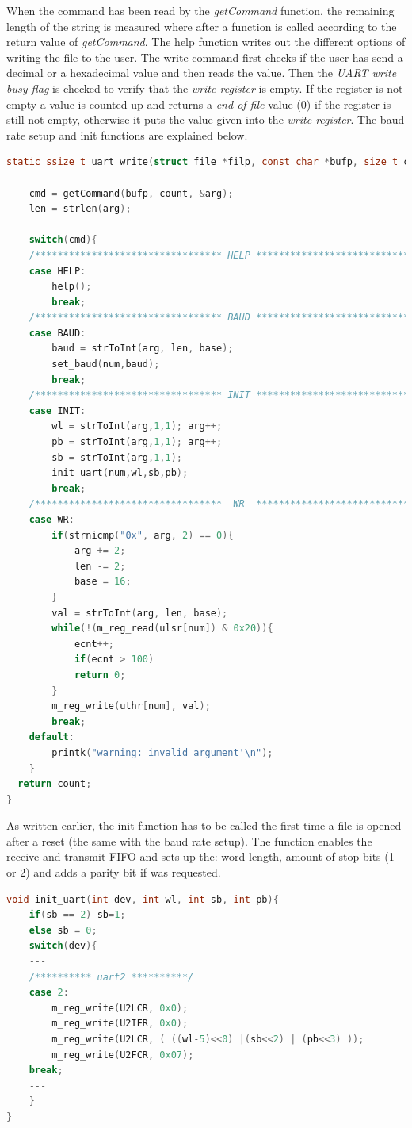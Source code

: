 When the command has been read by the \textit{getCommand} function, the remaining length of the string is measured where after a function is called according to the return value of \textit{getCommand}. The help function writes out the different options of writing the file to the user. The write command first checks if the user has send a decimal or a hexadecimal value and then reads the value. Then the \textit{UART write busy flag} is checked to verify that the \textit{write register} is empty. If the register is not empty a value is counted up and returns a \textit{end of file} value (0) if the register is still not empty, otherwise it puts the value given into the \textit{write register}. The baud rate setup and init functions are explained below.
\begin{lstlisting}[language=c]
static ssize_t uart_write(struct file *filp, const char *bufp, size_t count, loff_t *p_pos){
	---
	cmd = getCommand(bufp, count, &arg);
	len = strlen(arg);
	
	switch(cmd){
	/********************************* HELP ********************************************/
	case HELP:
	    help();
	    break;
	/********************************* BAUD ********************************************/
	case BAUD:
	    baud = strToInt(arg, len, base);
	    set_baud(num,baud);
	    break;
	/********************************* INIT ********************************************/
	case INIT:
	    wl = strToInt(arg,1,1); arg++;
	    pb = strToInt(arg,1,1); arg++;
	    sb = strToInt(arg,1,1);
	    init_uart(num,wl,sb,pb);
	    break;
	/*********************************  WR  ********************************************/
	case WR:
	    if(strnicmp("0x", arg, 2) == 0){
	        arg += 2;
	        len -= 2;
	        base = 16;
	    }
	    val = strToInt(arg, len, base);
	    while(!(m_reg_read(ulsr[num]) & 0x20)){
	        ecnt++;
	        if(ecnt > 100)
	        return 0;
	    }
	    m_reg_write(uthr[num], val);
	    break;
	default:
	    printk("warning: invalid argument'\n");
 	}
  return count;
}
\end{lstlisting}

As written earlier, the init function has to be called the first time a file is opened after a reset (the same with the baud rate setup). The function enables the receive and transmit FIFO and sets up the: word length, amount of stop bits (1 or 2) and adds a parity bit if was requested. 
\begin{lstlisting}[language=c]
void init_uart(int dev, int wl, int sb, int pb){
	if(sb == 2) sb=1;
	else sb = 0;
	switch(dev){
	---
	/********** uart2 **********/
	case 2:
	    m_reg_write(U2LCR, 0x0);
	    m_reg_write(U2IER, 0x0);
	    m_reg_write(U2LCR, ( ((wl-5)<<0) |(sb<<2) | (pb<<3) ));
	    m_reg_write(U2FCR, 0x07);
	break;
	---
	}
}
\end{lstlisting}


